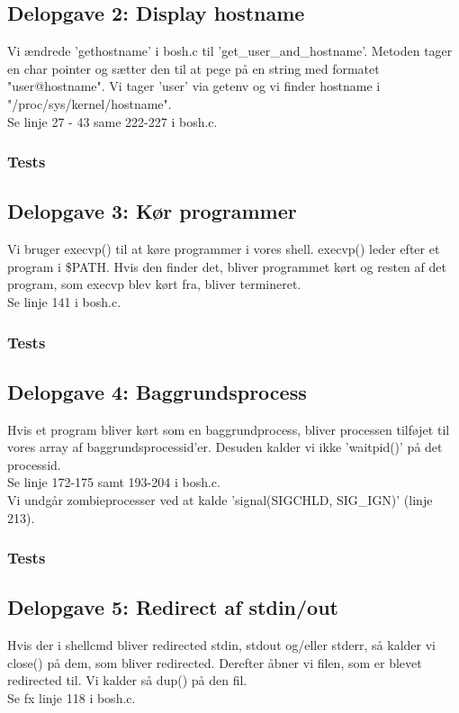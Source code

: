\subsection{Delopgave 2: Display hostname}
Vi ændrede 'gethostname' i bosh.c til 'get\_user\_and\_hostname'. Metoden tager en char pointer og sætter den til at pege på en string med formatet "user@hostname". Vi tager 'user' via getenv og vi finder hostname i "/proc/sys/kernel/hostname".
\\Se linje 27 - 43 same 222-227 i bosh.c.
\subsubsection{Tests}

\subsection{Delopgave 3: Kør programmer}
Vi bruger execvp() til at køre programmer i vores shell. execvp() leder efter et program i \$PATH. Hvis den finder det, bliver programmet kørt og resten af det program, som execvp blev kørt fra, bliver termineret. 
\\Se linje 141 i bosh.c.

\subsubsection{Tests}

\subsection{Delopgave 4: Baggrundsprocess}
Hvis et program bliver kørt som en baggrundprocess, bliver processen tilføjet til vores array af baggrundsprocessid'er. Desuden kalder vi ikke 'waitpid()' på det processid. 
\\Se linje 172-175 samt 193-204 i bosh.c.
\\Vi undgår zombieprocesser ved at kalde 'signal(SIGCHLD, SIG\_IGN)' (linje 213).
\subsubsection{Tests}

\subsection{Delopgave 5: Redirect af stdin/out}
Hvis der i shellcmd bliver redirected stdin, stdout og/eller stderr, så kalder vi close() på dem, som bliver redirected. Derefter åbner vi filen, som er blevet redirected til. Vi kalder så dup() på den fil.
\\Se fx linje 118 i bosh.c.
